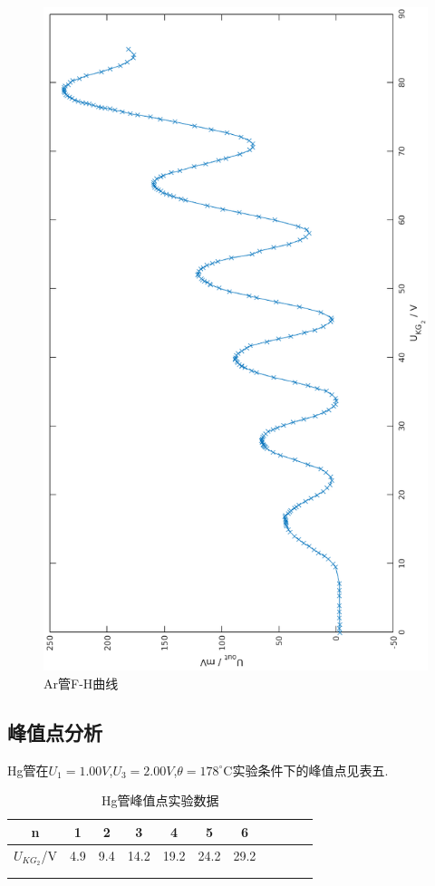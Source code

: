 \documentclass[a4paper,10pt,notitlepage]{article}
\begin{document}
\begin{figure}
	\includegraphics[scale=0.7]{fh2.png}
	\caption{Ar管F-H曲线}
\end{figure}

\subsection{峰值点分析}

	Hg管在$U_1 = 1.00V$,$U_3 = 2.00V$,$\theta = 178^\circ$C实验条件下的峰值点见表五.
	
\begin{center}

	\begin{longtable}{|c|c|c|c|c|c|c|c|c|c|c|}
	\hline
	n & 1 & 2 & 3 & 4 & 5 & 6 \\
	\hline
	$U_{KG_2}$/V & 4.9 & 9.4 & 14.2 & 19.2 & 24.2 & 29.2 \\
	\hline
	\multicolumn{1}{c}{ } \\
	\caption{Hg管峰值点实验数据}
	\end{longtable}

\end{center}
\end{document}
